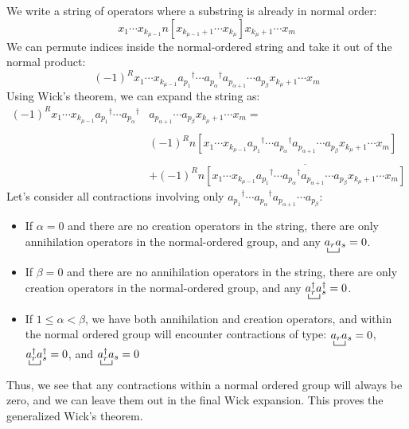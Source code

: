 \documentclass{article}
\newcommand{\ol}{\overline}
\newcommand{\ctr}{\bcontraction}
\newcommand{\dg}{\ensuremath{^\dagger} }
\newcommand{\cd}{\ensuremath{\cdots} }
\begin{document}
We write a string of operators where a substring is already in normal order:
\[x_1 \cd x_{k_{\mu-1}} n[x_{k_{\mu-1}+1} \cd x_{k_\mu}] x_{k_\mu+1} \cd x_m\]
We can permute indices inside the normal-ordered string and take it out of the normal product:   
\[(-1)^R x_1 \cd x_{k_{\mu-1}} a_{p_1}\dg \cd a_{p_\alpha}\dg a_{p_{\alpha + 1}} \cd a_{p_{\beta}} x_{k_\mu+1} \cd x_m\]
Using Wick's theorem, we can expand the string as: 
\begin{align*} 
(-1)^R x_1 \cd x_{k_{\mu-1}} a_{p_1}\dg \cd a_{p_\alpha}\dg & a_{p_{\alpha + 1}} \cd a_{p_{\beta}} x_{k_\mu+1} \cd x_m  = \\ \\
& (-1)^R n[x_1 \cd x_{k_{\mu-1}} a_{p_1}\dg \cd a_{p_\alpha}\dg  a_{p_{\alpha + 1}} \cd a_{p_{\beta}} x_{k_\mu+1} \cd x_m] \\ \\
&+ (-1)^R n\ol{[x_1 \cd x_{k_{\mu-1}} a_{p_1}\dg \cd a_{p_\alpha}\dg  a_{p_{\alpha + 1}} \cd a_{p_{\beta}} x_{k_\mu+1} \cd x_m] }
\end{align*}
Let's consider all contractions involving only $a_{p_1}\dg \cd a_{p_\alpha}\dg  a_{p_{\alpha + 1}} \cd a_{p_{\beta}}$:
\begin{itemize}
\item If $\alpha = 0$ and there are no creation operators in the string, there are only annihilation operators in the normal-ordered group,
and any $\ctr{}{a}{{}_r}{a} a_ra_s = 0$. 
\item  If $\beta = 0$ and there are no annihilation operators in the string, there are only creation operators in the normal-ordered group,
and any $\ctr{}{a}{{}_r\dg}{a} a_r\dg a_s\dg = 0$. 
\item If $1 \leq \alpha < \beta$, we have both annihilation and creation operators, and within the normal ordered group will encounter contractions of type: 
$\ctr{}{a}{{}_r}{a} a_ra_s = 0$, $\ctr{}{a}{{}_r\dg}{a} a_r\dg a_s\dg = 0$, and $\ctr{}{a}{{}_r\dg}{a} a_r\dg a_s = 0$
\end{itemize}
Thus, we see that any contractions within a normal ordered group will always be zero, and we can leave them out in the final Wick expansion.
This proves the generalized Wick's theorem. 
\end{document}
